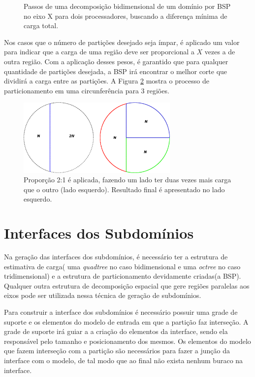 \begin{figure}[ht]
{	}
	\caption{Passos de uma decomposição bidimensional de um domínio por BSP no eixo X para dois processadores, buscando a diferença mínima de carga total.}
	\label{fig:passos_decomposicao_BSP}
\end{figure}


Nos casos que o número de partições desejado seja ímpar, é aplicado um valor para indicar que a carga de uma região deve ser proporcional a $X$ vezes a de outra região. Com a aplicação desses pesos, é garantido que para qualquer quantidade de partições desejada, a BSP irá encontrar o melhor corte que dividirá a carga entre as partições. A Figura \ref{fig:circunferencia_cortejunto} mostra o processo de particionamento em uma circunferência para 3 regiões.

\begin{figure}[!ht]
	\centering
	\includegraphics[width=0.7\textwidth]{fig/circunferencia_cortejunto.png}
	\caption{Proporção 2:1 é aplicada, fazendo um lado ter duas vezes mais carga que o outro (lado esquerdo). Resultado final é apresentado no lado esquerdo.}
	\label{fig:circunferencia_cortejunto}
\end{figure}

\section{Interfaces dos Subdomínios}

Na geração das interfaces dos subdomínios, é necessário ter a estrutura de estimativa de carga( uma \textit{quadtree} no caso bidimensional e uma \textit{octree} no caso tridimensional) e a estrutura de particionamento devidamente criadas(a BSP). Qualquer outra estrutura de decomposição espacial que gere regiões paralelas aos eixos pode ser utilizada nessa técnica de geração de subdomínios. 

Para construir a interface dos subdomínios é necessário possuir uma grade de suporte e os elementos do modelo de entrada em que a partição faz interseção. A grade de suporte irá guiar a a criação do elementos da interface, sendo ela responsável pelo tamanho e posicionamento dos mesmos. Os elementos do modelo que fazem interseção com a partição são necessários para fazer a junção da interface com o modelo, de tal modo que ao final não exista nenhum buraco na interface.

